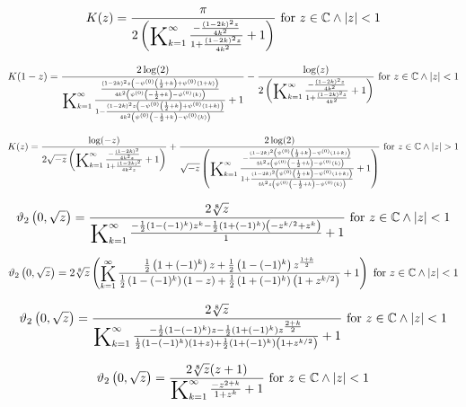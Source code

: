 \documentclass{article}
\newcommand{\bigK}{\mathop{\raisebox{-5pt}{\huge K}}}
\begin{document}
\[K(z)=\frac{\pi }{2 \left(\bigK_{k=1}^{\infty}\frac{-\frac{(1-2 k)^2 z}{4 k^2}}{1+\frac{(1-2 k)^2 z}{4 k^2}}+1\right)}\text{ for }z\in \mathbb{C}\land \left| z\right| <1\] 

\[K(1-z)=\frac{2 \log (2)}{\bigK_{k=1}^{\infty}\frac{\frac{(1-2 k)^2 z \left(-\psi ^{(0)}\left(\frac{1}{2}+k\right)+\psi ^{(0)}(1+k)\right)}{4 k^2 \left(\psi ^{(0)}\left(-\frac{1}{2}+k\right)-\psi ^{(0)}(k)\right)}}{1-\frac{(1-2 k)^2 z \left(-\psi ^{(0)}\left(\frac{1}{2}+k\right)+\psi ^{(0)}(1+k)\right)}{4 k^2 \left(\psi ^{(0)}\left(-\frac{1}{2}+k\right)-\psi ^{(0)}(k)\right)}}+1}-\frac{\log (z)}{2 \left(\bigK_{k=1}^{\infty}\frac{-\frac{(1-2 k)^2 z}{4 k^2}}{1+\frac{(1-2 k)^2 z}{4 k^2}}+1\right)}\text{ for }z\in \mathbb{C}\land \left| z\right| <1\] 

\[K(z)=\frac{\log (-z)}{2 \sqrt{-z} \left(\bigK_{k=1}^{\infty}\frac{-\frac{(1-2 k)^2}{4 k^2 z}}{1+\frac{(1-2 k)^2}{4 k^2 z}}+1\right)}+\frac{2 \log (2)}{\sqrt{-z} \left(\bigK_{k=1}^{\infty}\frac{-\frac{(1-2 k)^2 \left(\psi ^{(0)}\left(\frac{1}{2}+k\right)-\psi ^{(0)}(1+k)\right)}{4 k^2 z \left(\psi ^{(0)}\left(-\frac{1}{2}+k\right)-\psi ^{(0)}(k)\right)}}{1+\frac{(1-2 k)^2 \left(\psi ^{(0)}\left(\frac{1}{2}+k\right)-\psi ^{(0)}(1+k)\right)}{4 k^2 z \left(\psi ^{(0)}\left(-\frac{1}{2}+k\right)-\psi ^{(0)}(k)\right)}}+1\right)}\text{ for }z\in \mathbb{C}\land \left| z\right| >1\] 

\[\vartheta _2\left(0,\sqrt{z}\right)=\frac{2 \sqrt[8]{z}}{\bigK_{k=1}^{\infty}\frac{-\frac{1}{2} \left(1-(-1)^k\right) z^k-\frac{1}{2} \left(1+(-1)^k\right) \left(-z^{k/2}+z^k\right)}{1}+1}\text{ for }z\in \mathbb{C}\land \left| z\right| <1\] 

\[\vartheta _2\left(0,\sqrt{z}\right)=2 \sqrt[8]{z} \left(\bigK_{k=1}^{\infty}\frac{\frac{1}{2} \left(1+(-1)^k\right) z+\frac{1}{2} \left(1-(-1)^k\right) z^{\frac{1+k}{2}}}{\frac{1}{2} \left(1-(-1)^k\right) (1-z)+\frac{1}{2} \left(1+(-1)^k\right) \left(1+z^{k/2}\right)}+1\right)\text{ for }z\in \mathbb{C}\land \left| z\right| <1\] 

\[\vartheta _2\left(0,\sqrt{z}\right)=\frac{2 \sqrt[8]{z}}{\bigK_{k=1}^{\infty}\frac{-\frac{1}{2} \left(1-(-1)^k\right) z-\frac{1}{2} \left(1+(-1)^k\right) z^{\frac{2+k}{2}}}{\frac{1}{2} \left(1-(-1)^k\right) (1+z)+\frac{1}{2} \left(1+(-1)^k\right) \left(1+z^{k/2}\right)}+1}\text{ for }z\in \mathbb{C}\land \left| z\right| <1\] 

\[\vartheta _2\left(0,\sqrt{z}\right)=\frac{2 \sqrt[8]{z} (z+1)}{\bigK_{k=1}^{\infty}\frac{-z^{2+k}}{1+z^k}+1}\text{ for }z\in \mathbb{C}\land \left| z\right| <1\] 
\end{document}

